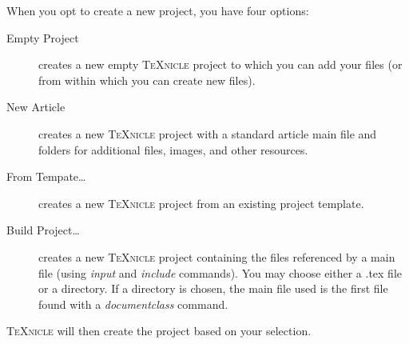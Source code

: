 \documentclass[11pt]{report}
\newcommand{\texnicle}{\textsc{TeXnicle}\xspace}
\begin{document}
When you opt to create a new project, you have four options:
	\begin{description}
		\item[Empty Project] creates a new empty \texnicle project to which you can add your files (or from within which you can create new files).
		\item[New Article] creates a new \texnicle project with a standard article main file and folders for additional files, images, and other resources.
		\item[From Tempate\ldots] creates a new \texnicle project from an existing project template.
		\item[Build Project\ldots] creates a new \texnicle project containing the files referenced by a main file (using \textsl{input} and \textsl{include} commands). You may choose either a {}.tex file or a directory. If a directory is chosen, the main file used is the first file found with a \textsl{documentclass} command.
	\end{description}

\texnicle will then create the project based on your selection.
\end{document}
